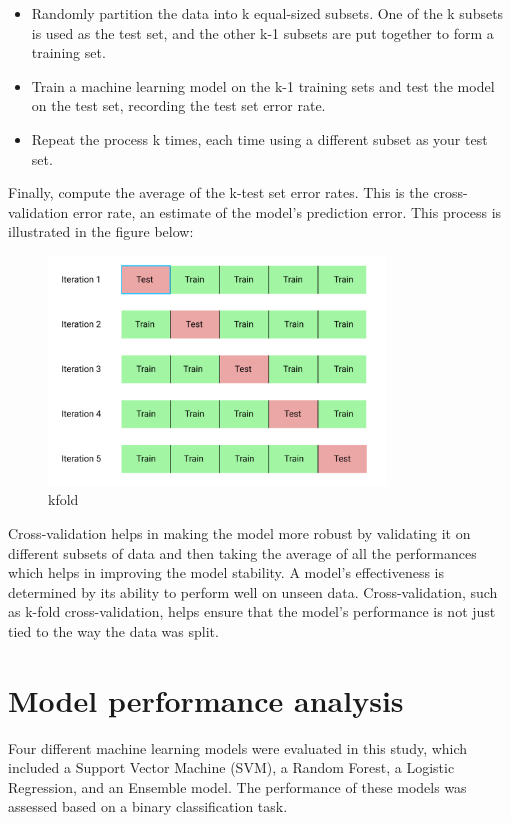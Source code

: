 \documentclass[12pt]{report}
\begin{document}
\begin{itemize}
      \item Randomly partition the data into k equal-sized subsets. One of the k subsets is
            used as the test set, and the other k-1 subsets are put together to form a
            training set.
      \item Train a machine learning model on the k-1 training sets and test the model on
            the test set, recording the test set error rate.
      \item  Repeat the process k times, each time using a different subset as your test
            set.
\end{itemize}

Finally, compute the average of the k-test set error rates. This is the
cross-validation error rate, an estimate of the model's prediction error. This
process is illustrated in the figure below:

\begin{figure}[hbt!]
      \centering
      \includegraphics[width=0.8\textwidth]{./figures/kfold.png}
      \caption{kfold}\label{fig:kfold}
\end{figure}

Cross-validation helps in making the model more robust by validating it on
different subsets of data and then taking the average of all the performances
which helps in improving the model stability. A model's effectiveness is
determined by its ability to perform well on unseen data. Cross-validation,
such as k-fold cross-validation, helps ensure that the model's performance is
not just tied to the way the data was split.\newpage

\section*{Model performance analysis}
Four different machine learning models were evaluated in this study, which
included a Support Vector Machine (SVM), a Random Forest, a Logistic Regression, and
an Ensemble model. The performance of these models was assessed based on a
binary classification task.\\
\end{document}

